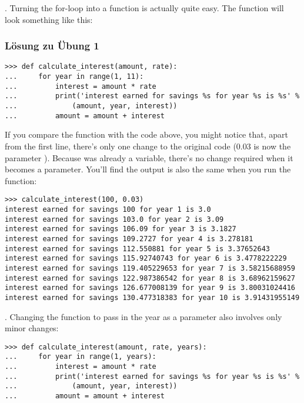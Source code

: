 . Turning the for-loop into a function is actually quite easy.  The function will look something like this:
\subsubsection{Lösung zu Übung 1}

\begin{listing}
\begin{verbatim}
>>> def calculate_interest(amount, rate):
...     for year in range(1, 11):
...         interest = amount * rate
...         print('interest earned for savings %s for year %s is %s' % 
...             (amount, year, interest))
...         amount = amount + interest
\end{verbatim}
\end{listing}

If you compare the function with the code above, you might notice that, apart from the first line, there's only one change to the original code (0.03 is now the parameter ). Because  was already a variable, there's no change required when it becomes a parameter. You'll find the output is also the same when you run the function:

\begin{listing}
\begin{verbatim}
>>> calculate_interest(100, 0.03)
interest earned for savings 100 for year 1 is 3.0
interest earned for savings 103.0 for year 2 is 3.09
interest earned for savings 106.09 for year 3 is 3.1827
interest earned for savings 109.2727 for year 4 is 3.278181
interest earned for savings 112.550881 for year 5 is 3.37652643
interest earned for savings 115.92740743 for year 6 is 3.4778222229
interest earned for savings 119.405229653 for year 7 is 3.58215688959
interest earned for savings 122.987386542 for year 8 is 3.68962159627
interest earned for savings 126.677008139 for year 9 is 3.80031024416
interest earned for savings 130.477318383 for year 10 is 3.91431955149
\end{verbatim}
\end{listing}

. Changing the function to pass in the year as a parameter also involves only minor changes:

\begin{listing}
\begin{verbatim}
>>> def calculate_interest(amount, rate, years):
...     for year in range(1, years):
...         interest = amount * rate
...         print('interest earned for savings %s for year %s is %s' %
...             (amount, year, interest))
...         amount = amount + interest
\end{verbatim}
\end{listing}

